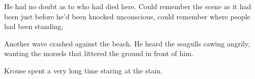 He had no doubt as to who had died here.  Could remember the scene as it had been just before he'd been knocked unconscious, could remember where people had been standing.



Another wave crashed against the beach.  He heard the seagulls cawing angrily, wanting the morsels that littered the ground in front of him.



Krouse spent a very long time staring at the stain.





